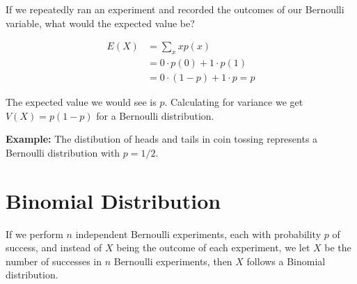 If we repeatedly ran an experiment and recorded the outcomes of our Bernoulli variable, what would the expected value be?

\begin{align*}
	E(X) & = \sum_{x}xp(x)\\
	& = 0\cdot p(0) + 1\cdot p(1) \\
	& = 0\cdot (1-p) + 1\cdot p = p
\end{align*}

The expected value we would see is $p$. Calculating for variance we get $V(X)=p(1-p)$ for a Bernoulli distribution.\newline \par

\textbf{Example:} The distibution of heads and tails in coin tossing represents a Bernoulli distribution with $p=1/2$.


\section{Binomial Distribution}
If we perform $n$ independent Bernoulli experiments, each with probability $p$ of success, and instead of $X$ being the outcome of each experiment, we let $X$ be the
number of successes in $n$ Bernoulli experiments, then $X$ follows a Binomial distribution.
